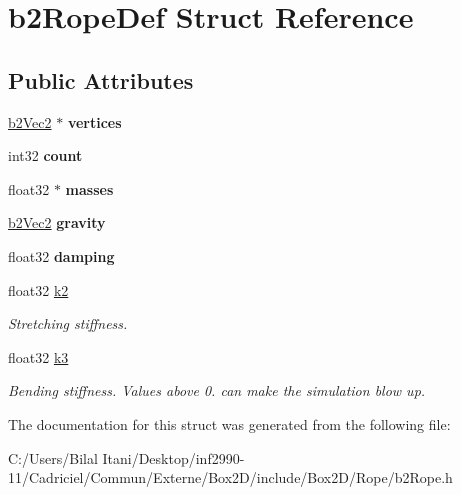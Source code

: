 \hypertarget{structb2_rope_def}{}\section{b2\+Rope\+Def Struct Reference}
\label{structb2_rope_def}
\subsection*{Public Attributes}
\begin{DoxyCompactItemize}
\item 
\hyperlink{structb2_vec2}{b2\+Vec2} $\ast$ {\bfseries vertices}\hypertarget{structb2_rope_def_ae18ad98b9796c505ae62ce58fa2f7051}{}\label{structb2_rope_def_ae18ad98b9796c505ae62ce58fa2f7051}

\item 
int32 {\bfseries count}\hypertarget{structb2_rope_def_a0c75d4289a807e31f32dc43a2276671f}{}\label{structb2_rope_def_a0c75d4289a807e31f32dc43a2276671f}

\item 
float32 $\ast$ {\bfseries masses}\hypertarget{structb2_rope_def_a78f75cce30ee253062ffa6f5462b36a1}{}\label{structb2_rope_def_a78f75cce30ee253062ffa6f5462b36a1}

\item 
\hyperlink{structb2_vec2}{b2\+Vec2} {\bfseries gravity}\hypertarget{structb2_rope_def_a90d98969150047662ce835ec1670fb32}{}\label{structb2_rope_def_a90d98969150047662ce835ec1670fb32}

\item 
float32 {\bfseries damping}\hypertarget{structb2_rope_def_a13ad872bb9d4926f3e4e49b7061613cb}{}\label{structb2_rope_def_a13ad872bb9d4926f3e4e49b7061613cb}

\item 
float32 \hyperlink{structb2_rope_def_a89de5d2c15afacd41722c76523e33826}{k2}\hypertarget{structb2_rope_def_a89de5d2c15afacd41722c76523e33826}{}\label{structb2_rope_def_a89de5d2c15afacd41722c76523e33826}

\begin{DoxyCompactList}\small\item\em Stretching stiffness. \end{DoxyCompactList}\item 
float32 \hyperlink{structb2_rope_def_a3f4749e0a309b53daf804c75adfb4ba8}{k3}\hypertarget{structb2_rope_def_a3f4749e0a309b53daf804c75adfb4ba8}{}\label{structb2_rope_def_a3f4749e0a309b53daf804c75adfb4ba8}

\begin{DoxyCompactList}\small\item\em Bending stiffness. Values above 0. can make the simulation blow up. \end{DoxyCompactList}\end{DoxyCompactItemize}


The documentation for this struct was generated from the following file\+:\begin{DoxyCompactItemize}
\item 
C\+:/\+Users/\+Bilal Itani/\+Desktop/inf2990-\/11/\+Cadriciel/\+Commun/\+Externe/\+Box2\+D/include/\+Box2\+D/\+Rope/b2\+Rope.\+h\end{DoxyCompactItemize}
